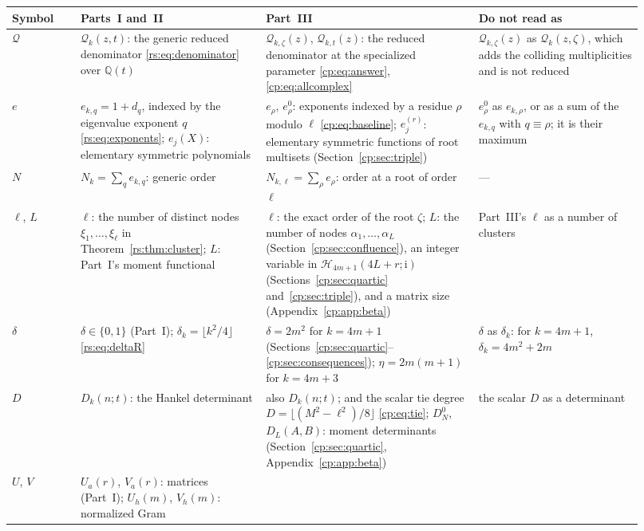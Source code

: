 \documentclass[11pt]{article}
\theoremstyle{definition}
\theoremstyle{remark}
\newcommand{\Q}{\mathbb Q}
\newcommand{\Ht}{\mathcal H}
\newcommand{\QQ}{\mathscr Q}
\newcommand{\ii}{\mathrm i}
\theoremstyle{definition}
\theoremstyle{plain}
\numberwithin{equation}{section}
\begin{document}
{\small
\begin{longtable}{@{}>{\raggedright\arraybackslash}p{0.10\linewidth}>{\raggedright\arraybackslash}p{0.27\linewidth}>{\raggedright\arraybackslash}p{0.31\linewidth}>{\raggedright\arraybackslash}p{0.24\linewidth}@{}}
\toprule
Symbol & Parts~I and~II & Part~III & Do not read as\\
\midrule
\endhead
$\QQ$ &
$\QQ_k(z,t)$: the generic reduced denominator \eqref{rs:eq:denominator}
over $\Q(t)$ &
$\QQ_{k,\zeta}(z)$, $\QQ_{k,t}(z)$: the reduced denominator at the
specialized parameter \eqref{cp:eq:answer}, \eqref{cp:eq:allcomplex} &
$\QQ_{k,\zeta}(z)$ as $\QQ_k(z,\zeta)$, which adds the colliding
multiplicities and is not reduced\\[3pt]
$e$ &
$e_{k,q}=1+d_q$, indexed by the eigenvalue exponent $q$
\eqref{rs:eq:exponents}; $e_j(X)$: elementary symmetric polynomials &
$e_\rho$, $e^0_\rho$: exponents indexed by a residue $\rho$ modulo $\ell$
\eqref{cp:eq:baseline}; $e_j^{(r)}$: elementary symmetric functions of root
multisets (Section~\ref{cp:sec:triple}) &
$e^0_\rho$ as $e_{k,\rho}$, or as a sum of the $e_{k,q}$ with
$q\equiv\rho$; it is their maximum\\[3pt]
$N$ &
$N_k=\sum_qe_{k,q}$: generic order &
$N_{k,\ell}=\sum_\rho e_\rho$: order at a root of order $\ell$ &
---\\[3pt]
$\ell$, $L$ &
$\ell$: the number of distinct nodes $\xi_1,\ldots,\xi_\ell$ in
Theorem~\ref{rs:thm:cluster}; $L$: Part~I's moment functional &
$\ell$: the exact order of the root $\zeta$; $L$: the number of nodes
$\alpha_1,\ldots,\alpha_L$ (Section~\ref{cp:sec:confluence}), an integer
variable in $\Ht_{4m+1}(4L+r;\ii)$ (Sections~\ref{cp:sec:quartic}
and~\ref{cp:sec:triple}), and a matrix size (Appendix~\ref{cp:app:beta}) &
Part~III's $\ell$ as a number of clusters\\[3pt]
$\delta$ &
$\delta\in\{0,1\}$ (Part~I); $\delta_k=\lfloor k^2/4\rfloor$
\eqref{rs:eq:deltaR} &
$\delta=2m^2$ for $k=4m+1$ (Sections~\ref{cp:sec:quartic}--\ref{cp:sec:consequences});
$\eta=2m(m+1)$ for $k=4m+3$ &
$\delta$ as $\delta_k$: for $k=4m+1$, $\delta_k=4m^2+2m$\\[3pt]
$D$ &
$D_k(n;t)$: the Hankel determinant &
also $D_k(n;t)$; and the scalar tie degree
$D=\lfloor(M^2-\ell^2)/8\rfloor$ \eqref{cp:eq:tie}; $D_N^0$, $D_L(A,B)$:
moment determinants (Section~\ref{cp:sec:quartic},
Appendix~\ref{cp:app:beta}) &
the scalar $D$ as a determinant\\[3pt]
$U$, $V$ &
$U_a(r)$, $V_a(r)$: matrices (Part~I); $U_h(m)$, $V_h(m)$: normalized Gram

\end{longtable}}
\end{document}
